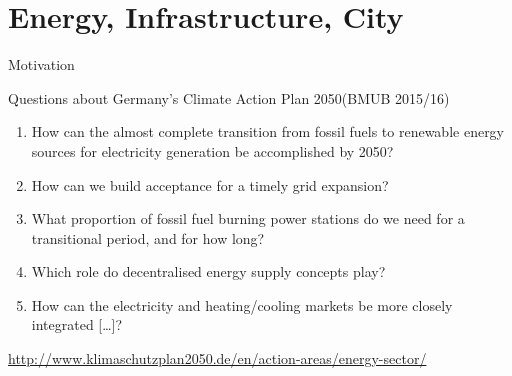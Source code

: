 
\section{Energy, Infrastructure, City}
\frame{\sectionpage}

\begin{frame}{Motivation}
    \begin{alertblock}{Questions about Germany's Climate Action Plan 2050\hfill (BMUB 2015/16)}
    \begin{enumerate}[<+->]\itemsep9pt
    \item How can the almost complete transition from fossil fuels to renewable energy sources for electricity generation be accomplished by 2050?
    \item How can we build acceptance for a timely grid expansion?
    \item What proportion of fossil fuel burning power stations do we need for a transitional period, and for how long?
    \item Which role do decentralised energy supply concepts play?
    \item How can the electricity and heating/cooling markets be more closely integrated [\dots]?
    \end{enumerate}
    \end{alertblock}

    \tiny
    \hspace{3.75em}\url{http://www.klimaschutzplan2050.de/en/action-areas/energy-sector/}
\end{frame}

